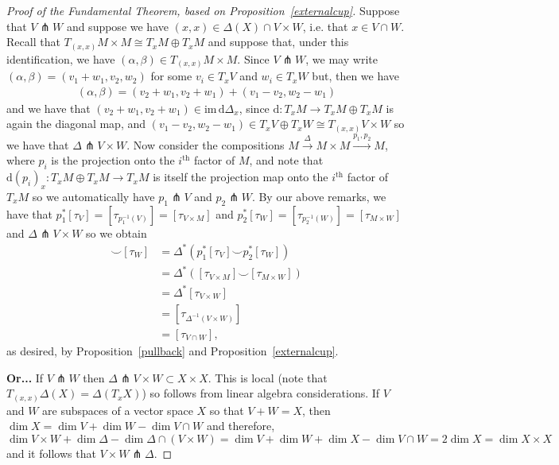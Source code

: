 \documentclass{amsart}          %
\begin{document}
\begin{proof}[Proof of the Fundamental Theorem, based on Proposition~\ref{externalcup}]

Suppose that $V\pitchfork W$ and suppose we have $(x,x)\in\Delta(X)\cap V\times W$, i.e. that $x\in V\cap W$. Recall that $T_{(x,x)}M\times M\cong T_xM\oplus T_xM$ and suppose that, under this identification, we have $(\alpha,\beta)\in T_{(x,x)}M\times M$. Since $V\pitchfork W$, we may write $(\alpha,\beta)=(v_1+w_1,v_2,w_2)$ for some $v_i\in T_xV$ and $w_i\in T_xW$ but, then we have\begin{align*}
(\alpha,\beta)=(v_2+w_1,v_2+w_1)+(v_1-v_2,w_2-w_1)
\end{align*}and we have that $(v_2+w_1,v_2+w_1)\in\mathrm{im}\,\mathrm{d}\Delta_x$, since $\mathrm{d}:T_xM\to T_xM\oplus T_xM$ is again the diagonal map, and $(v_1-v_2,w_2-w_1)\in T_xV\oplus T_xW\cong T_{(x,x)}V\times W$ so we have that $\Delta\pitchfork V\times W$. Now consider the compositions $M\stackrel{\Delta}{\to}M\times M\stackrel{p_1,p_2}{\longrightarrow}M$, where $p_i$ is the projection onto the $i^\text{th}$ factor of $M$, and note that $\mathrm{d}(p_i)_x:T_xM\oplus T_xM\to T_xM$ is itself the projection map onto the $i^\text{th}$ factor of $T_xM$ so we automatically have $p_1\pitchfork V$ and $p_2\pitchfork W$. By our above remarks, we have that $p_1^*[\tau_V]=\left[\tau_{p_1^{-1}(V)}\right]=[\tau_{V\times M}]$ and $p_2^*[\tau_W]=\left[\tau_{p_2^{-1}(W)}\right]=[\tau_{M\times W}]$ and $\Delta\pitchfork V\times W$ so we obtain\begin{align*}
[\tau_V]\smile[\tau_W]&=\Delta^*(p_1^*[\tau_V]\smile p_2^*[\tau_W])\\&=\Delta^*([\tau_{V\times M}]\smile[\tau_{M\times W}])\\&=\Delta^*[\tau_{V\times W}]\\&=\left[\tau_{\Delta^{-1}(V\times W)}\right]\\&=[\tau_{V\cap W}],
\end{align*}as desired, by Proposition~\ref{pullback} and Proposition~\ref{externalcup}.


{\bf Or...}
If $V \pitchfork W$ then $\Delta \pitchfork V \times W \subset X \times X$. This is local (note that $T_{(x,x)}\Delta(X) = \Delta(T_xX)$) so follows from linear algebra considerations. If $V$ and $W$ are subspaces of a vector space $X$ so that $V+ W= X$, then $\dim X = \dim V+ \dim W - \dim V\cap W$ and therefore, 
\[
\dim V\times W + \dim \Delta - \dim \Delta\cap (V\times W) = \dim V + \dim W + \dim X - \dim V\cap W= 2\dim X= \dim X\times X
\]
and it follows that $V\times W\pitchfork \Delta$.   


\end{proof}
\end{document}
